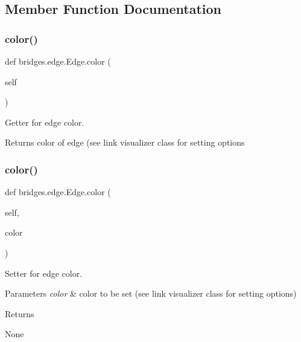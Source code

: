 \subsection{Member Function Documentation}
\mbox{\label{classbridges_1_1edge_1_1_edge_a24a4845aeae4ca6fc432b6d0b7fa78c2}} 
\subsubsection{\texorpdfstring{color()}{color()}\hspace{0.1cm}{\footnotesize\ttfamily [1/2]}}
{\footnotesize\ttfamily def bridges.\+edge.\+Edge.\+color (\begin{DoxyParamCaption}\item[{}]{self }\end{DoxyParamCaption})}



Getter for edge color. 

\begin{DoxyReturn}{Returns}
color of edge (see link visualizer class for setting options 
\end{DoxyReturn}
\mbox{\label{classbridges_1_1edge_1_1_edge_a81ccb5ffd5838829e1a2217846c4df77}} 
\subsubsection{\texorpdfstring{color()}{color()}\hspace{0.1cm}{\footnotesize\ttfamily [2/2]}}
{\footnotesize\ttfamily def bridges.\+edge.\+Edge.\+color (\begin{DoxyParamCaption}\item[{}]{self,  }\item[{}]{color }\end{DoxyParamCaption})}



Setter for edge color. 


\begin{DoxyParams}{Parameters}
{\em color} & color to be set (see link visualizer class for setting options) \\
\hline
\end{DoxyParams}
\begin{DoxyReturn}{Returns}


None 
\end{DoxyReturn}
\mbox{\label{classbridges_1_1edge_1_1_edge_abc3f52467d38ad2d7e06113d0c714ed6}} 
